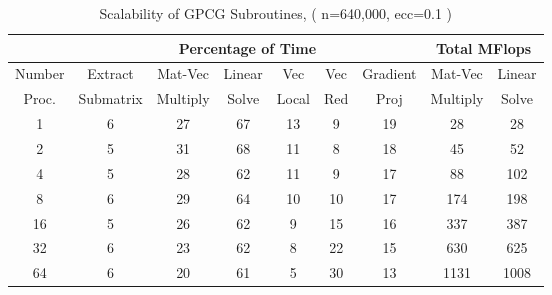 \begin{table}[h]
\small
\begin{center}
\begin{tabular}{|c|cccccc|cc|}
\hline
\multicolumn{1}{|c|}{} &
\multicolumn{6}{c|}{Percentage of Time}&
\multicolumn{2}{c|}{Total MFlops} \\
\hline
\multicolumn{1}{|c|}{Number}&
\multicolumn{1}{c}{Extract}&
\multicolumn{1}{c}{Mat-Vec}&
\multicolumn{1}{c}{Linear}&
\multicolumn{1}{c}{Vec} &
\multicolumn{1}{c}{Vec} &
\multicolumn{1}{c|}{Gradient} &
\multicolumn{1}{c}{Mat-Vec}&
\multicolumn{1}{c|}{Linear} \\

\multicolumn{1}{|c|}{Proc.}&
\multicolumn{1}{c}{Submatrix}&
\multicolumn{1}{c}{Multiply}&
\multicolumn{1}{c}{Solve}&
\multicolumn{1}{c}{Local} &
\multicolumn{1}{c}{Red} &
\multicolumn{1}{c|}{Proj} &
\multicolumn{1}{c}{Multiply}&
\multicolumn{1}{c|}{Solve} \\

\hline
1 & 6 & 27 & 67 & 13 & 9 & 19 & 28 & 28  \\
2 & 5 & 31 & 68 & 11 & 8 & 18 & 45 & 52   \\
4 & 5 & 28 & 62 & 11 & 9 & 17 & 88 & 102  \\
8 & 6 & 29 & 64 & 10 & 10 & 17 & 174 & 198 \\
16 & 5 & 26 & 62 & 9 & 15 & 16 & 337 & 387  \\
32 & 6 & 23 & 62 & 8 & 22 & 15 & 630 & 625  \\
64 & 6 & 20 & 61 & 5 & 30 & 13 & 1131 & 1008  \\
\hline
\end{tabular}
\caption{Scalability of GPCG Subroutines, ( n=640,000, ecc=0.1 ) }
\label{routines}
\end{center}
\end{table}


